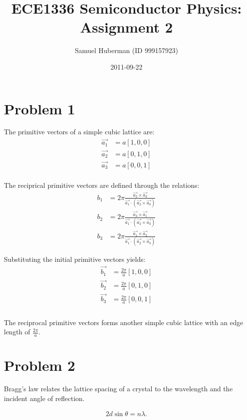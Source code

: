 \documentclass{article}
\numberwithin{equation}{section}
\begin{document}
\title{ECE1336 Semiconductor Physics: Assignment 2}
\author{Samuel Huberman (ID 999157923)}
\date{2011-09-22}
\maketitle

\section*{Problem 1}

The primitive vectors of a simple cubic lattice are:
\begin{align*}
\vec{a_1}&=a[1,0,0]\\
\vec{a_2}&=a[0,1,0]\\
\vec{a_3}&=a[0,0,1]\\
\end{align*}

The reciprical primitive vectors are defined through the relations:
\begin{align*}
	b_1 &= 2\pi \frac {\vec{a_2} \times \vec{a_3}}{\vec{a_1} \cdot (\vec{a_2} \times \vec{a_3})}
\\      b_2 &= 2\pi \frac {\vec{a_3} \times \vec{a_1}}{\vec{a_1} \cdot (\vec{a_2} \times \vec{a_3})}
\\      b_3 &= 2\pi \frac {\vec{a_1} \times \vec{a_2}}{\vec{a_1} \cdot (\vec{a_2} \times \vec{a_3})}
\end{align*}

Substituting the initial primitive vectors yields:
\\
\begin{align*}
\vec{b_1}&=\frac{2 \pi}{a}[1,0,0]\\
\vec{b_2}&=\frac{2 \pi}{a}[0,1,0]\\
\vec{b_3}&=\frac{2 \pi}{a}[0,0,1]\\
\end{align*}
\\
The reciprocal primitive vectors forms another simple cubic lattice with an edge length of $\frac{2\pi}{a}$.

\section*{Problem 2}
Bragg's law relates the lattice spacing of a crystal to the wavelength and the incident angle of reflection.

\begin{align*}
2d\sin \theta =n \lambda.
\end{align*}
\end{document}
